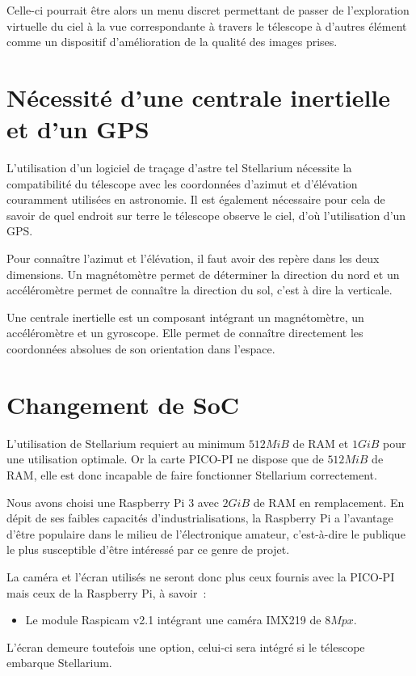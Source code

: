 Celle-ci pourrait être alors un menu discret permettant de passer de l'exploration virtuelle du ciel à la vue correspondante à travers le télescope à d'autres élément comme un dispositif d'amélioration de la qualité des images prises.

\section{Nécessité d'une centrale inertielle et d'un GPS}

L'utilisation d'un logiciel de traçage d'astre tel Stellarium nécessite la compatibilité du télescope avec les coordonnées d'azimut et d'élévation couramment utilisées en astronomie. Il est également nécessaire pour cela de savoir de quel endroit sur terre le télescope observe le ciel, d'où l'utilisation d'un GPS.

\vspace{1cm}

Pour connaître l'azimut et l'élévation, il faut avoir des repère dans les deux dimensions. Un magnétomètre permet de déterminer la direction du nord et un accéléromètre permet de connaître la direction du sol, c'est à dire la verticale.

Une centrale inertielle est un composant intégrant un magnétomètre, un accéléromètre et un gyroscope. Elle permet de connaître directement les coordonnées absolues de son orientation dans l'espace.

\section{Changement de SoC}

L'utilisation de Stellarium requiert au minimum $512MiB$ de RAM et $1GiB$ pour une utilisation optimale. Or la carte PICO-PI ne dispose que de $512MiB$ de RAM, elle est donc incapable de faire fonctionner Stellarium correctement.

\vspace{1cm}

Nous avons choisi une Raspberry Pi 3 avec $2GiB$ de RAM en remplacement. En dépit de ses faibles capacités d'industrialisations, la Raspberry Pi a l'avantage d'être populaire dans le milieu de l'électronique amateur, c'est-à-dire le publique le plus susceptible d'être intéressé par ce genre de projet.

\vspace{1cm}

La caméra et l'écran utilisés ne seront donc plus ceux fournis avec la PICO-PI mais ceux de la Raspberry Pi, à savoir~:
\begin{itemize}[label=$\bullet$]
	\item Le module Raspicam v2.1 intégrant une caméra IMX219 de $8Mpx$.
	\end{itemize}

L'écran demeure toutefois une option, celui-ci sera intégré si le télescope embarque Stellarium.


